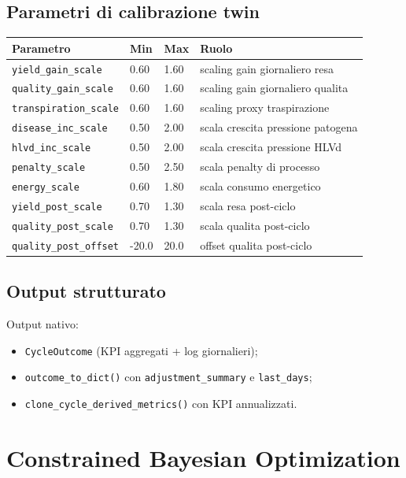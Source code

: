 ﻿\documentclass[11pt,a4paper]{report}
\begin{document}
\section{Parametri di calibrazione twin}
\begin{longtable}{@{}p{4.0cm}p{2.2cm}p{2.2cm}p{5.0cm}@{}}
\toprule
Parametro & Min & Max & Ruolo \\ \midrule
\texttt{yield\_gain\_scale} & 0.60 & 1.60 & scaling gain giornaliero resa \\
\texttt{quality\_gain\_scale} & 0.60 & 1.60 & scaling gain giornaliero qualita \\
\texttt{transpiration\_scale} & 0.60 & 1.60 & scaling proxy traspirazione \\
\texttt{disease\_inc\_scale} & 0.50 & 2.00 & scala crescita pressione patogena \\
\texttt{hlvd\_inc\_scale} & 0.50 & 2.00 & scala crescita pressione HLVd \\
\texttt{penalty\_scale} & 0.50 & 2.50 & scala penalty di processo \\
\texttt{energy\_scale} & 0.60 & 1.80 & scala consumo energetico \\
\texttt{yield\_post\_scale} & 0.70 & 1.30 & scala resa post-ciclo \\
\texttt{quality\_post\_scale} & 0.70 & 1.30 & scala qualita post-ciclo \\
\texttt{quality\_post\_offset} & -20.0 & 20.0 & offset qualita post-ciclo \\
\bottomrule
\end{longtable}

\section{Output strutturato}
Output nativo:
\begin{itemize}
  \item \texttt{CycleOutcome} (KPI aggregati + log giornalieri);
  \item \texttt{outcome\_to\_dict()} con \texttt{adjustment\_summary} e \texttt{last\_days};
  \item \texttt{clone\_cycle\_derived\_metrics()} con KPI annualizzati.
\end{itemize}

\newpage
\chapter{Constrained Bayesian Optimization}
\end{document}
